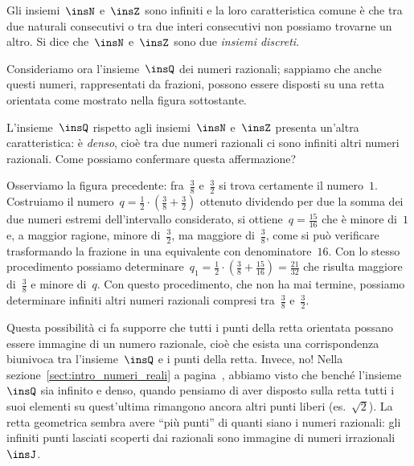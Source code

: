 Gli insiemi~$\insN$ e~$\insZ$ sono infiniti e la loro caratteristica comune è che tra due naturali consecutivi o tra due interi consecutivi
non possiamo trovarne un altro. Si dice che~$\insN$ e~$\insZ$ sono due \emph{insiemi discreti}.

Consideriamo ora l'insieme~$\insQ$ dei numeri razionali; sappiamo che anche questi numeri, rappresentati da frazioni, possono essere disposti
su una retta orientata come mostrato nella figura sottostante.
\begin{center}
 
\end{center}
L'insieme~$\insQ$ rispetto agli insiemi~$\insN$ e~$\insZ$ presenta un'altra caratteristica: è \emph{denso}, cioè tra due numeri razionali
ci sono infiniti altri numeri razionali.
Come possiamo confermare questa affermazione?

Osserviamo la figura precedente: fra~$\frac{3}{8}$ e~$\frac{3}{2}$ si trova certamente il numero~$1$.
Costruiamo il numero~$q=\frac{1}{2} \cdot \left(\frac{3}{8}+\frac{3}{2}\right)$ ottenuto dividendo per due la somma dei due numeri estremi
dell'intervallo considerato, si ottiene~$q=\frac{15}{16}$ che è minore di~$1$ e, a maggior ragione, minore di~$\frac{3}{2}$,
ma maggiore di~$\frac{3}{8}$, come si può verificare trasformando la frazione in una equivalente con denominatore~$16$.
Con lo stesso procedimento possiamo determinare~$q_{1}=\frac{1}{2}\cdot \left(\frac{3}{8}+\frac{15}{16}\right)=\frac{21}{32}$
che risulta maggiore di~$\frac{3}{8}$ e minore di~$q$. Con questo procedimento, che non ha mai termine, possiamo determinare
infiniti altri numeri razionali compresi tra~$\frac{3}{8}$ e~$\frac{3}{2}$.
\begin{center}
 
\end{center}

Questa possibilità ci fa supporre che tutti i punti della retta orientata possano essere immagine di un numero razionale,
cioè che esista una corrispondenza biunivoca tra l'insieme~$\insQ$ e i punti della retta.
Invece, no! Nella sezione~\ref{sect:intro_numeri_reali} a pagina~\pageref{sect:intro_numeri_reali}, abbiamo visto che benché l'insieme~$\insQ$ sia infinito e denso,
quando pensiamo di aver disposto sulla retta tutti i suoi elementi su quest'ultima rimangono ancora altri punti liberi (es.~$\sqrt{2}$).
La retta geometrica sembra avere ``più punti'' di quanti siano i numeri razionali: gli infiniti punti lasciati scoperti dai razionali
sono immagine di numeri irrazionali $\insJ$.

